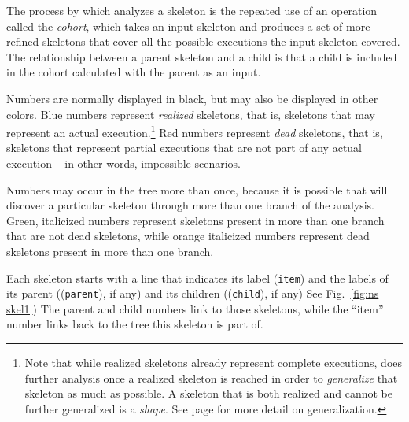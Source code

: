 The process by which {\cpsa} analyzes a skeleton is the repeated use
of an operation called the \emph{cohort}, which takes an
input skeleton and produces a set of more refined skeletons that cover
all the possible executions the input skeleton covered.  The
relationship between a parent skeleton and a child is that a child is
included in the cohort calculated with the parent as an input.

 Numbers are normally
displayed in black, but may also be displayed in other colors.  Blue
numbers represent \emph{realized} skeletons, that is, skeletons that
may represent an actual execution.\footnote{Note that while realized
  skeletons already represent complete executions, \cpsa does further
  analysis once a realized skeleton is reached in order to
  \emph{generalize} that skeleton as much as possible.  A skeleton
  that is both realized and cannot be further generalized is a
  \emph{shape}.  See page \pageref{anchor:generalization}
  for more detail on generalization.}  Red numbers represent
\emph{dead} skeletons, that is, skeletons that represent partial
executions that are not part of any actual execution -- in other
words, impossible scenarios.

 Numbers may occur in
the tree more than once, because it is possible that {\cpsa} will
discover a particular skeleton through more than one branch of the
analysis.  Green, italicized numbers represent skeletons present in
more than one branch that are not dead skeletons, while orange
italicized numbers represent dead skeletons present in more than one
branch.

Each skeleton starts with a line that indicates its label
(\texttt{item}) and the labels of its parent ((\texttt{parent}), if
any) and its children ((\texttt{child}), if any) See Fig.~\ref{fig:ns
  skel1}) The parent and child numbers link to those skeletons, while
the ``item'' number links back to the tree this skeleton is part of.

